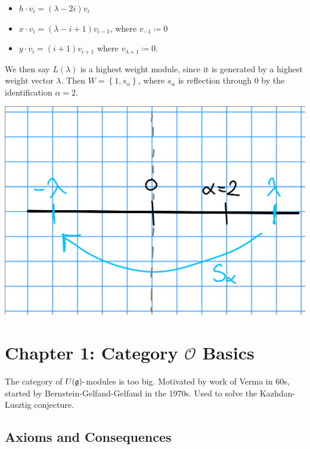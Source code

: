 \documentclass[11pt]{scrartcl}
\theoremstyle{definition}
\theoremstyle{theorem}
\theoremstyle{proof}
\theoremstyle{definition}
\theoremstyle{break}
\theoremstyle{problem}
\providecommand{\tightlist}{%
  \setlength{\itemsep}{0pt}\setlength{\parskip}{0pt}}
\newcommand{\dash}[0]{{\hbox{-}}}
\newcommand{\definedas}[0]{\coloneqq}
\newcommand{\lieg}[0]{{\mathfrak{g}}}
\newcommand{\theset}[1]{\left\{{#1}\right\}}
\begin{document}
\begin{itemize}
\tightlist
\item
  \(h\cdot v_i = (\lambda - 2i) v_i\)
\item
  \(x \cdot v_i = (\lambda - i + 1) v_{i-1}\), where
  \(v_{-1} \definedas 0\)
\item
  \(y \cdot v_i = (i + 1)v_{i+1}\) where
  \(v_{\lambda + 1} \definedas 0\).
\end{itemize}

We then say \(L(\lambda)\) is a highest weight module, since it is
generated by a highest weight vector \(\lambda\). Then
\(W = \theset{1, s_\alpha}\), where \(s_\alpha\) is reflection through 0
by the identification \(\alpha = 2\).

\includegraphics{figures/2020-01-15-09:38.png}\\

\hypertarget{chapter-1-category-mathcal-o-basics}{%
\section{\texorpdfstring{Chapter 1: Category \(\mathcal O\)
Basics}{Chapter 1: Category \textbackslash mathcal O Basics}}\label{chapter-1-category-mathcal-o-basics}}

The category of \(U(\lieg)\dash\)modules is too big. Motivated by work
of Verma in 60s, started by Bernstein-Gelfand-Gelfand in the 1970s. Used
to solve the Kazhdan-Lusztig conjecture.

\hypertarget{axioms-and-consequences}{%
\subsection{Axioms and Consequences}\label{axioms-and-consequences}}
\end{document}
